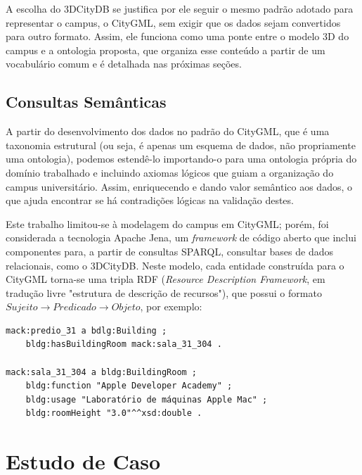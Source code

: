 \documentclass[
  article,   %
  11pt,      %
  oneside,   %
  a4paper,   %
  english,   %
  brazil,    %
  sumario=tradicional
]{abntex2}
\newcommand{\en}[1]{\foreignlanguage{english}{\textit{#1}}}
\begin{document}
A escolha do 3DCityDB se justifica por ele seguir o mesmo padrão adotado para representar o campus,
o CityGML, sem exigir que os dados sejam convertidos para outro formato.
Assim, ele funciona como uma ponte entre o modelo 3D do campus e a ontologia proposta, que organiza
esse conteúdo a partir de um vocabulário comum e é detalhada nas próximas seções.

\subsection{Consultas Semânticas}

A partir do desenvolvimento dos dados no padrão do CityGML, que é uma taxonomia estrutural (ou
seja, é apenas um esquema de dados, não propriamente uma ontologia), podemos estendê-lo
importando-o para uma ontologia própria do domínio trabalhado e incluindo axiomas lógicos que guiam
a organização do campus universitário.
Assim, enriquecendo e dando valor semântico aos dados, o que ajuda encontrar se há contradições
lógicas na validação destes.

Este trabalho limitou-se à modelagem do campus em CityGML; porém, foi considerada a tecnologia
Apache Jena, um \en{framework} de código aberto que inclui componentes para, a partir de consultas
SPARQL, consultar bases de dados relacionais, como o 3DCityDB.
Neste modelo, cada entidade construída para o CityGML torna-se uma tripla RDF (\en{Resource Description Framework}, em tradução livre "estrutura de descrição de recursos"), que possui o formato $Sujeito \rightarrow Predicado \rightarrow Objeto$, por exemplo:

\begin{codigo}[htbp]
  \caption{Exemplo com triplas RDF}
  \label{cod:rdf_example}
  \begin{verbatim}
mack:predio_31 a bdlg:Building ;
    bldg:hasBuildingRoom mack:sala_31_304 .

mack:sala_31_304 a bldg:BuildingRoom ;
    bldg:function "Apple Developer Academy" ;
    bldg:usage "Laboratório de máquinas Apple Mac" ;
    bldg:roomHeight "3.0"^^xsd:double .
  \end{verbatim}
\end{codigo}

\section{Estudo de Caso}
\end{document}
